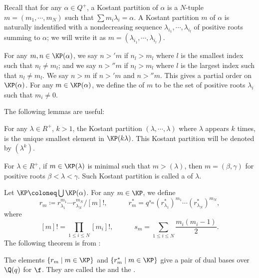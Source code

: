 Recall that for any $\alpha\in Q^+$, a Kostant partition of $\alpha$ is a $N$-tuple
$m = (m_1,\cdots,m_N)$ such that $\sum m_i\lambda_i = \alpha$. A Kostant partition $m$
of $\alpha$ is naturally indentified with a nondecreasing sequence
$\lambda_{i_1},\cdots,\lambda_{i_l}$ of positive roots summing to $\alpha$;
we will write it as $m = (\lambda_{i_1},\cdots,\lambda_{i_l})$.

For any $m,n\in\KP(\alpha)$, we say $n>'m$ if $n_l>m_l$ where 
$l$ is the smallest index such that $n_l\ne m_l$; and we say $n>''m$ if $n_l>m_l$ where 
$l$ is the largest index such that $n_l\ne m_l$. We say $n>m$ if
$n>'m$ and $n>''m$. This gives a partial order on $\KP(\alpha)$.
For any $m\in\KP(\alpha)$, we define the  of $m$ to be the 
set of positive roots $\lambda_i$ such that $m_i\ne 0$. 

The following lemmas are useful:

\begin{lemma}\label{minimal-element-in-KP}
    For any $\lambda\in R^+$, $k>1$, the Kostant partition 
    $(\lambda,\cdots,\lambda)$ where $\lambda$ appears $k$ times, is the unique
    smallest element in $\KP(k\lambda)$. This Kostant partition
    will be denoted by $(\lambda^k)$.
\end{lemma}

\begin{lemma}
    For $\lambda\in R^+$, if $m\in\KP(\lambda)$ is minimal such that
    $m>(\lambda)$, then $m = (\beta,\gamma)$ for positive roots
    $\beta<\lambda<\gamma$. Such Kostant partition is called
    a  of $\lambda$.
\end{lemma}

Let $\KP \coloneq  \bigcup \KP(\alpha)$. For any $m\in\KP$, we define
\[
    r_m \coloneq  r_{\lambda_1}^{m_1}\cdots r_{\lambda_N}^{m_N}/[m]!,
    \hspace{3em} r_m^* = q^{s_m}(r_{\lambda_1}^*)^{m_1}\cdots(r_{\lambda_N}^*)^{m_N},
\]    
where 
\[
    [m]! = \prod_{1\le i\le N}[m_i]!,\hspace{3em}
    s_m = \sum_{1\le i\le N}\dfrac{m_i(m_i-1)}2.
\]
The following theorem is from \cite{L}:

\begin{theorem}\label{pbw-basis}
    The elements $\{r_m\mid m\in\KP\}$ and $\{r_m^*\mid m\in\KP\}$
    give a pair of dual bases over $\Q(q)$ for $\f$. They are called the  and the 
    .
\end{theorem}


